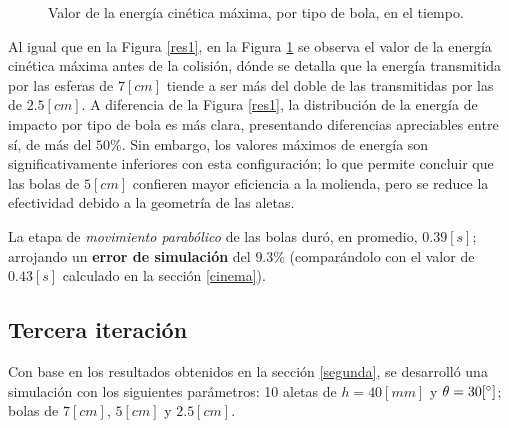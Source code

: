\begin{figure}[h!]
\centering
{}
\caption{Valor de la energ\'ia cin\'etica m\'axima, por tipo de bola, en el tiempo.}
\label{res2}
\end{figure}

\noindent
\justify

Al igual que en la Figura \ref{res1}, en la Figura \ref{res2} se observa el valor de la energ\'ia cin\'etica m\'axima antes de la colisi\'on, d\'onde se detalla que la energ\'ia transmitida por las esferas de $7 [cm]$ tiende a ser m\'as del doble de las transmitidas por las de $2.5 [cm]$. A diferencia de la Figura \ref{res1}, la distribuci\'on de la energ\'ia de impacto por tipo de bola es m\'as clara, presentando diferencias apreciables entre s\'i, de m\'as del $50 \%$. Sin embargo, los valores m\'aximos de energ\'ia son significativamente inferiores con esta configuraci\'on; lo que permite concluir que las bolas de $5 [cm]$ confieren mayor eficiencia a la molienda, pero se reduce la efectividad debido a la geometr\'ia de las aletas.

\noindent
\justify

La etapa de \textit{movimiento parab\'olico} de las bolas dur\'o, en promedio, $0.39 [s]$; arrojando un \textbf{error de simulaci\'on} del $9.3 \%$ (compar\'andolo con el valor de $0.43 [s]$ calculado en la secci\'on \ref{cinema}).

\subsection{Tercera iteraci\'on}

\noindent
\justify

Con base en los resultados obtenidos en la secci\'on \ref{segunda}, se desarroll\'o una simulaci\'on con los siguientes par\'ametros: 10 aletas de $h = 40 [mm]$ y $\theta = 30 [\degree ]$; bolas de $7 [cm]$, $5 [cm]$ y $2.5 [cm]$.


